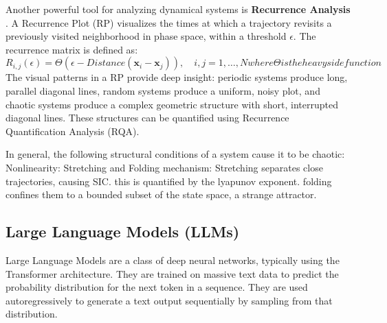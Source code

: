 \documentclass[a4paper,12pt]{article}
\begin{document}
Another powerful tool for analyzing dynamical systems is \textbf{Recurrence Analysis} \cite{MARWAN2007237}. A Recurrence Plot (RP) visualizes the times at which a trajectory revisits a previously visited neighborhood in phase space, within a threshold $\epsilon$. The recurrence matrix is defined as:
\begin{equation}
    R_{i,j}(\epsilon) = \Theta(\epsilon - Distance(\mathbf{x}_i - \mathbf{x}_j)), \quad i,j = 1, \dots, N
    where \Theta is the heavyside function 
\end{equation}
The visual patterns in a RP provide deep insight: periodic systems produce long, parallel diagonal lines, random systems produce a uniform, noisy plot, and chaotic systems produce a complex geometric structure with short, interrupted diagonal lines. These structures can be quantified using Recurrence Quantification Analysis (RQA).



In general, the following structural conditions of a system cause it to be chaotic:
Nonlinearity: %
Stretching and Folding mechanism: Stretching separates close trajectories, causing SIC. this is quantified by the lyapunov exponent. folding confines them to a bounded subset of the state space, a strange attractor.
\cite{Hnon1976ATM}
\cite{ROSSLER1976}
\cite{strogatz_textbook}


\subsection{Large Language Models (LLMs)}
Large Language Models are a class of deep neural networks, typically using the Transformer architecture. They are trained on massive text data to predict the probability distribution for the next token in a sequence. They are used autoregressively to generate a text output sequentially by sampling from that distribution.
\end{document}
